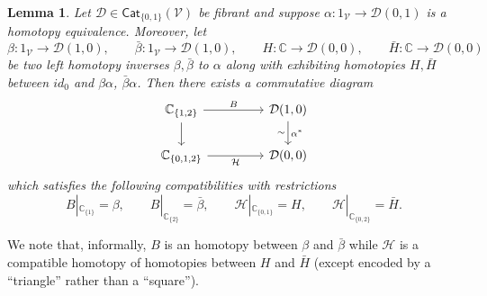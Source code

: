 \documentclass[a4paper,10pt
,draft
]{article}%
\numberwithin{equation}{section}
\numberwithin{figure}{section}
\newtheorem{lemma}[equation]{Lemma}%
\theoremstyle{definition} %
\newcommand{\V}{\ensuremath{\mathcal V}}
\newcommand{\1}{\ensuremath{\mathbbm 1}}%
\begin{document}
\begin{lemma}\label{HOMTPOFHOMTP LEM}
Let $\mathcal{D} \in \mathsf{Cat}_{\{0,1\}}(\V)$
be fibrant and suppose 
$\alpha \colon 1_{\V} \to \mathcal{D}(0,1)$
is a homotopy equivalence. 
%
Moreover, let 
\[\beta \colon 1_{\V} \to \mathcal{D}(1,0), \qquad
\bar{\beta} \colon 1_{\V} \to \mathcal{D}(1,0),\qquad
H \colon \mathbb{C} \to \mathcal{D}(0,0), \qquad
\bar{H} \colon \mathbb{C} \to \mathcal{D}(0,0)
\]
be two left homotopy inverses $\beta,\bar{\beta}$ to $\alpha$
along with exhibiting homotopies 
$H,\bar{H}$
between $id_0$ and $\beta \alpha$, $\bar{\beta}\alpha$.
Then there exists a commutative diagram 
\begin{equation}
\begin{tikzcd}[column sep = 45pt]
	\mathbb{C}_{\{1,2\}}
	\ar{d}
	\arrow{r}{B}
&
	\mathcal{D}(1,0)
	\arrow{d}{\alpha^{\**}}[swap]{\sim}
\\
	\mathbb{C}_{\{0,1,2\}}
	\arrow{r}[swap]{\mathcal{H}}
&
	\mathcal{D}(0,0)
\end{tikzcd}
\end{equation}
which satisfies the following compatibilities with restrictions
\[
B|_{\mathbb{C}_{\{1\}}} = \beta, \qquad
B|_{\mathbb{C}_{\{2\}}} = \bar{\beta}, \qquad
\mathcal{H}|_{\mathbb{C}_{\{0,1\}}} = H, \qquad
\mathcal{H}|_{\mathbb{C}_{\{0,2\}}} = \bar{H}.
\]
\end{lemma}

We note that, informally, $B$ is an homotopy between $\beta$ and $\bar{\beta}$
while $\mathcal{H}$
is a compatible homotopy of homotopies 
between $H$ and $\bar{H}$
(except encoded by a ``triangle'' rather than a ``square'').
\end{document}
